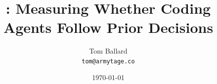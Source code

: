 \documentclass[11pt]{article}
\title{\benchname: Measuring Whether Coding Agents Follow Prior Decisions}
\author{Tom Ballard\\\texttt{tom@armytage.co}\\%
}
\date{\today}
\begin{document}
\maketitle

\begin{abstract}

\end{abstract}













\end{document}

